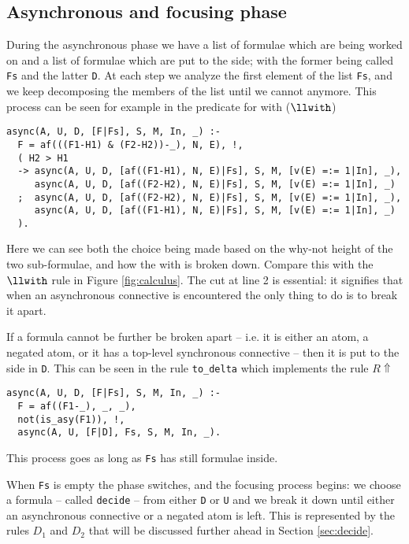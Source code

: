 \subsection{Asynchronous and focusing phase}
During the asynchronous phase we have a list of formulae which are being worked on and a list of formulae which are put to the side; with the former being called \texttt{Fs} and the latter \texttt{D}.
At each step we analyze the first element of the list \texttt{Fs}, and we keep decomposing the members of the list until we cannot anymore.
This process can be seen for example in the predicate for with ($\llwith$)
\begin{verbatim}
async(A, U, D, [F|Fs], S, M, In, _) :-
  F = af(((F1-H1) & (F2-H2))-_), N, E), !,
  ( H2 > H1	
  -> async(A, U, D, [af((F1-H1), N, E)|Fs], S, M, [v(E) =:= 1|In], _), 
     async(A, U, D, [af((F2-H2), N, E)|Fs], S, M, [v(E) =:= 1|In], _) 
  ;  async(A, U, D, [af((F2-H2), N, E)|Fs], S, M, [v(E) =:= 1|In], _),
     async(A, U, D, [af((F1-H1), N, E)|Fs], S, M, [v(E) =:= 1|In], _)
  ).
\end{verbatim}
Here we can see both the choice being made based on the why-not height of the two sub-formulae, and how the with is broken down.
Compare this with the $\llwith$ rule in Figure \ref{fig:calculus}.
The cut at line 2 is essential: it signifies that when an asynchronous connective is encountered the only thing to do is to break it apart.

If a formula cannot be further be broken apart -- i.e. it is either an atom, a negated atom, or it has a top-level synchronous connective -- then it is put to the side in \texttt{D}.
This can be seen in the rule \texttt{to\_delta} which implements the rule $R\!\Uparrow$
\begin{verbatim}
async(A, U, D, [F|Fs], S, M, In, _) :-
  F = af((F1-_), _, _),
  not(is_asy(F1)), !,
  async(A, U, [F|D], Fs, S, M, In, _).
\end{verbatim}
This process goes as long as \texttt{Fs} has still formulae inside.

When \texttt{Fs} is empty the phase switches, and the focusing process begins: we choose a formula -- called \texttt{decide} -- from either \texttt{D} or \texttt{U} and we break it down until either an asynchronous connective or a negated atom is left. 
This is represented by the rules $D_1$ and $D_2$ that will be discussed further ahead in Section \ref{sec:decide}.

